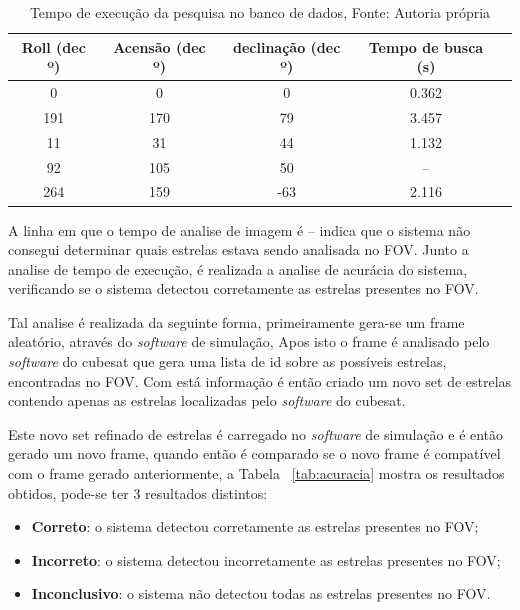 \begin{table}[ht]
    \centering

    \begin{tabular}{|c|c|c|c|c|}
        \hline
        \textbf{Roll (dec º)} & \textbf{Acensão (dec º)} & \textbf{declinação (dec º)} & \textbf{Tempo de busca (s)} \\ \hline
        0                     & 0                        & 0                           & 0.362                       \\ \hline
        191                   & 170                      & 79                          & 3.457                       \\ \hline
        11                    & 31                       & 44                          & 1.132                       \\ \hline
        92                    & 105                      & 50                          & --                          \\ \hline
        264                   & 159                      & -63                         & 2.116                       \\ \hline
    \end{tabular}
    \caption{Tempo de execução da pesquisa no banco de dados, Fonte: Autoria própria}
    \label{tab:tempo_de_execucao_db}
\end{table}

A linha em que o tempo de analise de imagem é -- indica que o sistema não consegui determinar quais estrelas estava sendo analisada no FOV.
Junto a analise de tempo de execução, é realizada a analise de acurácia do sistema,
verificando se o sistema detectou corretamente as estrelas presentes no FOV.

Tal analise é realizada da seguinte forma, primeiramente gera-se um frame aleatório, através do \textit{software} de simulação,
Apos isto o frame é analisado pelo \textit{software} do cubesat que gera uma lista de id sobre as possíveis estrelas, encontradas no FOV.
Com está informação é então criado um novo set de estrelas contendo apenas as estrelas localizadas pelo \textit{software} do cubesat.

Este novo set refinado de estrelas é carregado no \textit{software} de simulação e é então gerado um novo frame, quando então é comparado se o novo frame é compatível com o frame gerado anteriormente,
a Tabela ~\ref{tab:acuracia} mostra os resultados obtidos, pode-se ter 3 resultados distintos:

\begin{itemize}
    \item \textbf{Correto}: o sistema detectou corretamente as estrelas presentes no FOV;
    \item \textbf{Incorreto}: o sistema detectou incorretamente as estrelas presentes no FOV;
    \item \textbf{Inconclusivo}: o sistema não detectou todas as estrelas presentes no FOV.
\end{itemize}

